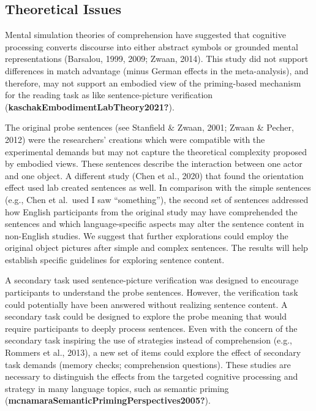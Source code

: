 \documentclass[
  man]{apa7}
\begin{document}
\hypertarget{theoretical-issues}{%
\subsection{Theoretical Issues}\label{theoretical-issues}}

Mental simulation theories of comprehension have suggested that cognitive processing converts discourse into either abstract symbols or grounded mental representations (Barsalou, 1999, 2009; Zwaan, 2014). This study did not support differences in match advantage (minus German effects in the meta-analysis), and therefore, may not support an embodied view of the priming-based mechanism for the reading task as like sentence-picture verification (\textbf{kaschakEmbodimentLabTheory2021?}).

The original probe sentences (see Stanfield \& Zwaan, 2001; Zwaan \& Pecher, 2012) were the researchers' creations which were compatible with the experimental demands but may not capture the theoretical complexity proposed by embodied views. These sentences describe the interaction between one actor and one object. A different study (Chen et al., 2020) that found the orientation effect used lab created sentences as well. In comparison with the simple sentences (e.g., Chen et al.~used I saw ``something''), the second set of sentences addressed how English participants from the original study may have comprehended the sentences and which language-specific aspects may alter the sentence content in non-English studies. We suggest that further explorations could employ the original object pictures after simple and complex sentences. The results will help establish specific guidelines for exploring sentence content.

A secondary task used sentence-picture verification was designed to encourage participants to understand the probe sentences. However, the verification task could potentially have been answered without realizing sentence content. A secondary task could be designed to explore the probe meaning that would require participants to deeply process sentences. Even with the concern of the secondary task inspiring the use of strategies instead of comprehension (e.g., Rommers et al., 2013), a new set of items could explore the effect of secondary task demands (memory checks; comprehension questions). These studies are necessary to distinguish the effects from the targeted cognitive processing and strategy in many language topics, such as semantic priming (\textbf{mcnamaraSemanticPrimingPerspectives2005?}).
\end{document}

